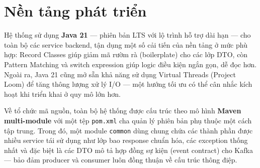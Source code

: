 \documentclass[../DoAn.tex]{subfiles}
\begin{document}

\section{Nền tảng phát triển}
\label{section:3.1}

Hệ thống sử dụng \textbf{Java 21} --- phiên bản LTS với lộ trình hỗ trợ dài hạn --- cho toàn
bộ các service backend, tận dụng một số cải tiến của nền tảng ở mức phù hợp: Record Classes
giúp giảm mã rườm rà (boilerplate) cho các lớp DTO, còn Pattern Matching và switch expression
giúp logic điều kiện ngắn gọn, dễ đọc hơn. Ngoài ra, Java 21 cũng mở sẵn khả năng sử dụng
Virtual Threads (Project Loom) để tăng thông lượng xử lý I/O --- một hướng tối ưu có thể cân
nhắc kích hoạt khi triển khai ở quy mô lớn hơn.

Về tổ chức mã nguồn, toàn bộ hệ thống được cấu trúc theo mô hình \textbf{Maven multi-module}
với một tệp \texttt{pom.xml} cha quản lý phiên bản phụ thuộc một cách tập trung. Trong đó,
một module \texttt{common} dùng chung chứa các thành phần được nhiều service tái sử dụng như
lớp bao response chuẩn hóa, các exception thống nhất và đặc biệt là các DTO mô tả hợp đồng
sự kiện (event contract) cho Kafka --- bảo đảm producer và consumer luôn đồng thuận về cấu
trúc thông điệp.
\end{document}
